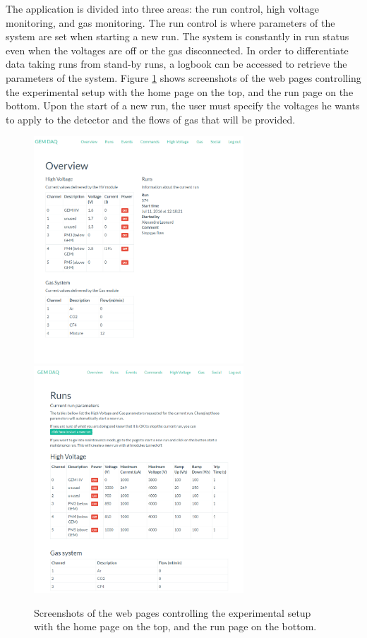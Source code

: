       The application is divided into three areas: the run control, high voltage monitoring, and gas monitoring. The run control is where parameters of the system are set when starting a new run. The system is constantly in run status even when the voltages are off or the gas disconnected. In order to differentiate data taking runs from stand-by runs, a logbook can be accessed to retrieve the parameters of the system. Figure \ref{fig:III-1-app-control} shows screenshots of the web pages controlling the experimental setup with the home page on the top, and the run page on the bottom. Upon the start of a new run, the user must specify the voltages he wants to apply to the detector and the flows of gas that will be provided. \\

      \begin{figure}[p!]
        \centering
        \includegraphics[width=0.7\textwidth]{img/III-1-arch/app-home.png}
        \includegraphics[width=0.7\textwidth]{img/III-1-arch/app-runs.png} \\
        \caption{Screenshots of the web pages controlling the experimental setup with the home page on the top, and the run page on the bottom.}
        \label{fig:III-1-app-control}
      \end{figure}

